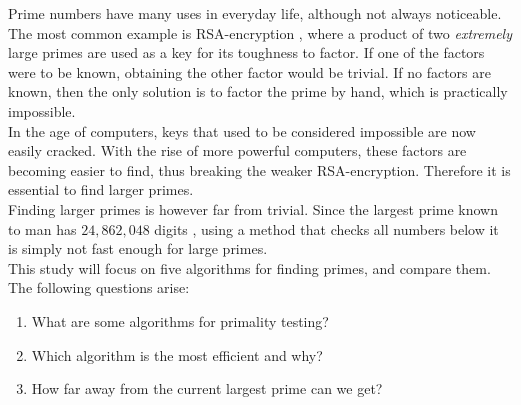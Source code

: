 \documentclass[main.tex]{subfiles}
\begin{document}
Prime numbers have many uses in everyday life, although not always noticeable. The most
common example is RSA-encryption \cite{rsa}, where a product of two
\emph{extremely} large primes are used as a key for its toughness to factor. If
one of the factors were to be known, obtaining the other factor would be trivial. If no factors are known, then the only solution is to factor the
prime by hand, which is practically impossible. \\

In the age of computers, keys that used to be considered impossible are now
easily cracked. With the rise of more powerful computers, these factors
are becoming easier to find, thus breaking the weaker RSA-encryption. Therefore it is essential to find larger primes. \\

Finding larger primes is however far from trivial. Since the largest prime known
to man has $24,862,048$ digits \cite{prime:largest_digits}, using a method that
checks all numbers below it is simply not fast enough for large primes. \\

This study will focus on five algorithms for finding primes, and compare them.
The following questions arise:

\begin{enumerate}
\item What are some algorithms for primality testing?
\item Which algorithm is the most efficient and why?
\item How far away from the current largest prime can we get?
\end{enumerate}
\end{document}
